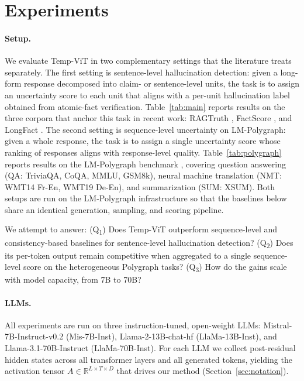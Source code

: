 \section{Experiments}
\label{sec:experiments}

\paragraph{Setup.} We evaluate Temp-ViT in two complementary settings
that the literature treats separately. The first setting is sentence-level
hallucination detection: given a long-form response decomposed into
claim- or sentence-level units, the task is to assign an uncertainty
score to each unit that aligns with a per-unit hallucination label
obtained from atomic-fact verification. Table~\ref{tab:main} reports
results on the three corpora that anchor this task in recent work:
RAGTruth \citep{niu2024ragtruth}, FactScore \citep{min2023}, and
LongFact \citep{wei2024}. The second setting is sequence-level uncertainty on
LM-Polygraph: given a whole response, the task is to assign a single
uncertainty score whose ranking of responses aligns with response-level
quality. Table~\ref{tab:polygraph} reports results on the LM-Polygraph
benchmark \citep{fadeeva2023lmpolygraph,vashurin2025lmpolygraph},
covering question answering (QA: TriviaQA, CoQA, MMLU, GSM8k),
neural machine translation (NMT: WMT14 Fr-En, WMT19 De-En), and
summarization (SUM: XSUM). Both setups are run on the LM-Polygraph
infrastructure so that the baselines below share an identical
generation, sampling, and scoring pipeline.

We attempt to answer:
(Q\textsubscript{1}) Does Temp-ViT outperform sequence-level and
consistency-based baselines for sentence-level hallucination
detection? (Q\textsubscript{2}) Does its per-token output remain
competitive when aggregated to a single sequence-level score on the
heterogeneous Polygraph tasks? (Q\textsubscript{3}) How do the gains
scale with model capacity, from 7B to 70B?

\paragraph{LLMs.} All experiments are run on three instruction-tuned,
open-weight LLMs:
Mistral-7B-Instruct-v0.2 \citep{albertqjiang2023} (Mis-7B-Inst),
Llama-2-13B-chat-hf \citep{touvron2023} (LlaMa-13B-Inst), and
Llama-3.1-70B-Instruct \citep{touvron2023} (LlaMa-70B-Inst). For each
LLM we collect post-residual hidden states across all transformer
layers and all generated tokens, yielding the activation tensor
$A \in \mathbb{R}^{L \times T \times D}$ that drives our method
(Section~\ref{sec:notation}).


